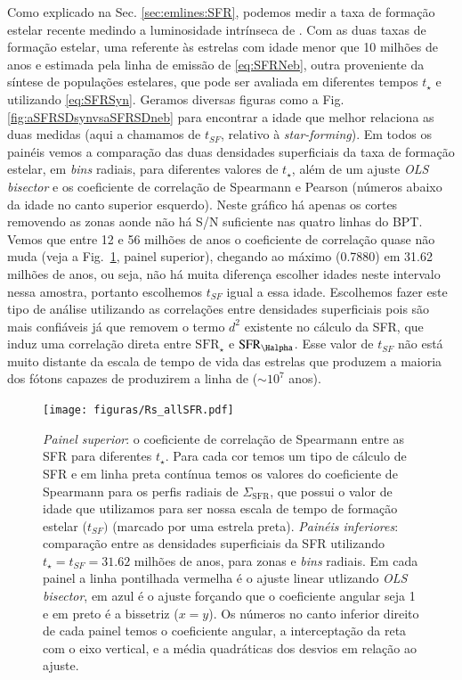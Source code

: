 Como explicado na Sec. \ref{sec:emlines:SFR}, podemos medir a taxa de formação estelar recente
medindo a luminosidade intrínseca de \Halpha. Com as duas taxas de formação estelar, uma referente
às estrelas com idade menor que 10 milhões de anos e estimada pela linha de emissão de \Halpha
\eqref{eq:SFRNeb}, outra proveniente da síntese de populações estelares, que pode ser avaliada em
diferentes tempos $t_\star$ e utilizando \eqref{eq:SFRSyn}. Geramos diversas figuras como a Fig.
\ref{fig:aSFRSDsynvsaSFRSDneb} para encontrar a idade que melhor relaciona as duas medidas (aqui a
chamamos de $t_{SF}$, relativo à {\em star-forming}). Em todos os painéis vemos a comparação das
duas densidades superficiais da taxa de formação estelar, em {\em bins} radiais, para diferentes
valores de $t_\star$, além de um ajuste {\em OLS bisector} e os coeficiente de correlação de
Spearmann e Pearson (números abaixo da idade no canto superior esquerdo). Neste gráfico há apenas os
cortes removendo as zonas aonde não há S/N suficiente nas quatro linhas do BPT. Vemos que entre 12 e
56 milhões de anos o coeficiente de correlação quase não muda (veja a Fig.\ \ref{fig:SFRsynvsneb},
painel superior), chegando ao máximo (0.7880) em 31.62 milhões de anos, ou seja, não há muita
diferença escolher idades neste intervalo nessa amostra, portanto escolhemos $t_{SF}$ igual a essa
idade. Escolhemos fazer este tipo de análise utilizando as correlações entre densidades superficiais
pois são mais confiáveis já que removem o termo $d^2$ existente no cálculo da SFR, que induz uma
correlação direta entre $\mathrm{SFR}_\star$ e $\mathrm{SFR}_{\Halpha}$. Esse valor de $t_{SF}$ não
está muito distante da escala de tempo de vida das estrelas que produzem a maioria dos fótons
capazes de produzirem a linha de \Halpha ($\sim10^7$ anos).

\begin{figure}
	\centering
	\texttt{[image: figuras/Rs\_allSFR.pdf]}
	\caption[Comparação entre as SFR]
	{\emph{Painel superior}: o coeficiente de correlação de Spearmann entre as SFR para diferentes
$t_\star$. Para cada cor temos um tipo de cálculo de SFR e em linha preta contínua temos os valores
do coeficiente de Spearmann para os perfis radiais de $\Sigma_{\mathrm{SFR}}$, que possui o valor de
idade que utilizamos para ser nossa escala de tempo de formação estelar ($t_{SF})$ (marcado
por uma estrela preta). \emph{Painéis inferiores}: comparação entre as densidades superficiais da
SFR utilizando $t_\star = t_{SF} = 31.62$ milhões de anos, para zonas e {\em bins} radiais. Em cada
painel a linha pontilhada vermelha é o ajuste linear utlizando {\em OLS bisector}, em azul é o ajuste
forçando que o coeficiente angular seja 1 e em preto é a bissetriz ($x = y$). Os números no canto
inferior direito de cada painel temos o coeficiente angular, a interceptação da reta com o eixo
vertical, e a média quadráticas dos desvios em relação ao ajuste.}
	\label{fig:SFRsynvsneb}
\end{figure}


